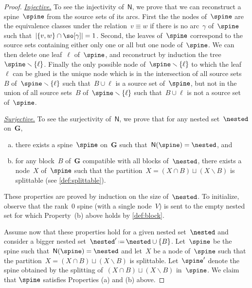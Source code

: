 \documentclass{amsart}
\theoremstyle{definition}
\renewcommand{\b}[1]{{\boldsymbol{#1}}} %
\newcommand{\ssm}{\smallsetminus} %
\newcommand{\eqdef}{\mbox{\,\raisebox{0.2ex}{\scriptsize\ensuremath{\mathrm:}}\ensuremath{=}\,}} %
\newcommand{\para}[1]{\medskip\noindent\uline{\textit{#1.}}} %
\newcommand{\vertexSet}{V}
\newcommand{\spineToNested}{\mathsf{N}} %
\begin{document}
\begin{proof}
  \para{Injective}
  To see the injectivity of~$\spineToNested$, we prove that we can reconstruct a spine~$\spine$ from the source sets of its arcs.
  First the the nodes of~$\spine$ are the equivalence classes under the relation~$v \equiv w$ if there is no arc~$\gamma$ of~$\spine$ such that~$|\{v,w\} \cap \so[\gamma]| = 1$.
  Second, the leaves of~$\spine$ correspond to the source sets containing either only one or all but one node of~$\spine$. 
  We can then delete one leaf~$\ell$ of~$\spine$, and reconstruct by induction the tree~$\spine \ssm \{\ell\}$. 
  Finally the only possible node of~$\spine \ssm \{\ell\}$ to which the leaf~$\ell$ can be glued is the unique node which is in the intersection of all source sets~$B$ of~$\spine \ssm \{\ell\}$ such that~$B \cup \ell$ is a source set of~$\spine$, but not in the union of all source sets~$B$ of~$\spine \ssm \{\ell\}$ such that~$B \cup \ell$ is not a source set of~$\spine$.

  \para{Surjective}
  To see the surjectivity of~$\spineToNested$, we prove that for any nested set~$\nested$ on~$\b{G}$,
\begin{enumerate}[(a)]
\item there exists a spine~$\spine$ on~$\b{G}$ such that~$\spineToNested(\spine) = \nested$, and
\item for any block~$B$ of~$\b{G}$ compatible with all blocks of~$\nested$, there exists a node~$X$ of~$\spine$ such that the partition~$X = (X \cap B) \sqcup (X \ssm B)$ is splittable (see \cref{def:splittable}).
\end{enumerate}
  These properties are proved by induction on the size of~$\nested$.  
  To initialize, observe that the rank~$0$ spine (with a single node~$\vertexSet$) is sent to the empty nested set for which Property~(b) above holds by \cref{def:block}.

  Assume now that these properties hold for a given nested set~$\nested$ and consider a bigger nested set~$\nested' \eqdef \nested \cup \{B\}$.
  Let~$\spine$ be the spine such that~$\spineToNested(\spine) = \nested$ and let~$X$ be a node of~$\spine$ such that the partition~$X = (X \cap B) \sqcup (X \ssm B)$ is splittable.
  Let~$\spine'$ denote the spine obtained by the splitting of~$(X \cap B) \sqcup (X \ssm B)$ in~$\spine$.
  We claim that $\spine$ satisfies Properties (a) and (b) above.
  

\end{proof}
\end{document}
